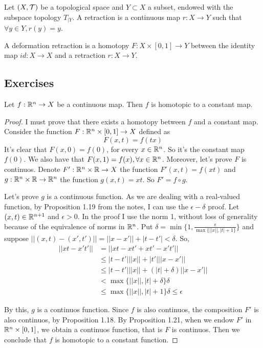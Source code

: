 \begin{definition}
    Let $(X, \mathcal{T})$ be a topological space and $Y \subset X$ a subset, endowed
    with the subspace topology $T_{|Y}$. A retraction is a continuous map $r :
    X \to Y$ such that $\forall y \in Y, r(y) = y$. 
    
    A deformation retraction is a homotopy $F : X \times [0, 1] \to Y$ between
    the identity map $id: X \to X$ and a retraction $r : X \to Y$.
\end{definition}

\subsection{Exercises}

\begin{exercise}
    Let $f : \mathbb{R}^n \to X$ be a continuous map. Then $f$ is homotopic to a constant map.
\end{exercise}

\begin{proof}

I must prove that there exists a homotopy between $f$ and a constant map.
Consider the function $F : \mathbb{R}^n \times [0,1] \to X$ defined as 
$$
F(x,t) = f(tx) 
$$
It's clear that $F(x,0) = f(0)$, for every $x \in \mathbb{R}^n$. So it's the constant
map $f(0)$. We also have that $F(x,1) = f(x), \forall x \in \mathbb{R}^n$. 
Moreover, let's prove $F$ is continuos. Denote $F' : \mathbb{R}^n \times \mathbb{R} \to X$ the
function $F'(x,t) = f(xt)$ and $g: \mathbb{R}^n \times \mathbb{R} \to \mathbb{R}^n$ the function
$g(x,t) = xt$. So $F' = f \circ g$. 

Let's prove $g$ is a continuous function. As we are dealing with a real-valued
function, by Proposition 1.19 from the notes, I can use the $\epsilon-\delta$
proof. Let $(x,t) \in \mathbb{R}^{n+1}$ and $\epsilon > 0$. In the proof I use the
norm 1, without loss of generality because of the equivalence of norms in
$\mathbb{R}^n$. Put $\delta = \min\{1, \frac{\epsilon}{\max\{||x||, |t| + 1\}} \}$ and suppose $||(x,t) - (x',t')|| = ||x - x'|| + |t -
t'| < \delta$. So,
\begin{equation*}
    \begin{split}
        ||xt - x't'|| &= ||xt - xt' + xt' - x't'|| \\
        &\le |t - t'|||x|| + |t'|||x - x'|| \\
        &\le |t - t'|||x|| + (|t| + \delta)||x - x'|| \\
        &< \max\{||x||, |t| + \delta\}\delta \\
        &\le \max\{||x||, |t| + 1\}\delta \le \epsilon
    \end{split}
\end{equation*} 

By this, $g$ is a continuos function. Since $f$ is also continuos, the
composition $F'$ is also continuos, by Proposition 1.18. By Proposition 1.21,
when we endow $F'$ in $\mathbb{R}^n \times [0,1]$, we obtain a continuos function,
that is $F$ is continuos. Then we conclude that $f$ is homotopic to a constant
function. 

\end{proof}

